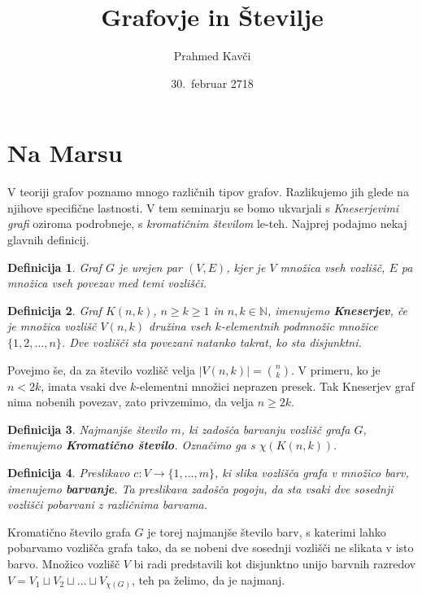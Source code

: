\documentclass[a4paper,12pt]{article}
\title{Grafovje in Številje}
\author{Prahmed Kavči}
\date{30.\ februar 2718}
\newtheorem{definicija}{Definicija}
\begin{document}
 
\maketitle


\section{Na Marsu}

V teoriji grafov poznamo mnogo različnih tipov grafov. Razlikujemo jih glede na njihove specifične lastnosti. V tem seminarju se bomo ukvarjali s {\em Kneserjevimi grafi} oziroma podrobneje, s {\em kromatičnim številom} le-teh. Najprej podajmo nekaj glavnih definicij.


\begin{definicija}
{\em Graf} $G$ je urejen par $(V,E)$, kjer je $V$ množica vseh vozlišč, $E$ pa množica vseh povezav med temi vozlišči.
\end{definicija} 

\begin{definicija}
Graf $K(n,k)$, $n \geq k \geq 1$ in $n, k \in \mathbb{N}$, imenujemo \mbox{\textbf{Kneserjev}}, če je množica vozlišč $V(n,k)$ družina vseh $k$-elementnih podmnožic množice $\{1, 2, \ldots, n\}$. Dve vozlišči sta povezani natanko takrat, ko sta disjunktni. 
\end{definicija}

Povejmo še, da za število vozlišč velja $|V(n,k)|={{n}\choose{k}}$. V primeru, ko je $n < 2k$, imata vsaki dve $k$-elementni množici neprazen presek. Tak Kneserjev graf nima nobenih povezav, zato privzemimo, da velja $n \geq 2k$.


\begin{definicija}
Najmanjše število $m$, ki zadošča barvanju vozlišč grafa $G$, imenujemo \textbf {Kromatično število}. Označimo ga s $\chi(K(n,k)).$
\end{definicija}

\begin{definicija}
Preslikavo $c: V \rightarrow \{1, \ldots, m\}$, ki slika vozlišča grafa v množico barv, imenujemo \textbf {barvanje}. Ta preslikava zadošča pogoju, da sta vsaki dve sosednji vozlišči pobarvani z različnima barvama.
\end{definicija}

Kromatično število grafa $G$ je torej najmanjše število barv, s katerimi lahko pobarvamo vozlišča grafa tako, da se nobeni dve sosednji vozlišči ne slikata v isto barvo. Množico vozlišč $V$ bi radi predstavili kot disjunktno unijo barvnih razredov $V = V_1 \sqcup V_2 \sqcup \ldots \sqcup V_{\chi(G)}$, teh pa želimo, da je najmanj.
\newpage 
\end{document}
